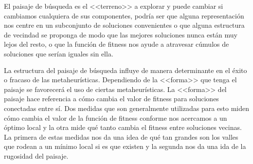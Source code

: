 \medskip
El paisaje de búsqueda es el <<terreno>> a explorar y puede cambiar si cambiamos cualquiera de sus componentes, podría ser que alguna representación nos centre en un subconjunto de soluciones convenientes o que alguna estructura de vecindad se proponga de modo que las mejores soluciones nunca están muy lejos del resto, o que la función de fitness nos ayude a atravesar cúmulos de soluciones que serían iguales sin ella.

La estructura del paisaje de búsqueda influye de manera determinante en el éxito o fracaso de las metaheurísticas. Dependiendo de la <<forma>> que tenga el paisaje se favorecerá el uso de ciertas metaheurísticas. La <<forma>> del paisaje hace referencia a cómo cambia el valor de fitness para soluciones conectadas entre sí. Dos medidas que son generalmente utilizadas para esto miden cómo cambia el valor de la función de fitness conforme nos acercamos a un óptimo local y la otra mide qué tanto cambia el fitness entre soluciones vecinas\cite{skauffman}. La primera de estas medidas nos da una idea de qué tan grandes son los valles que rodean a un mínimo local si es que existen y la segunda nos da una ida de la rugosidad del paisaje.

